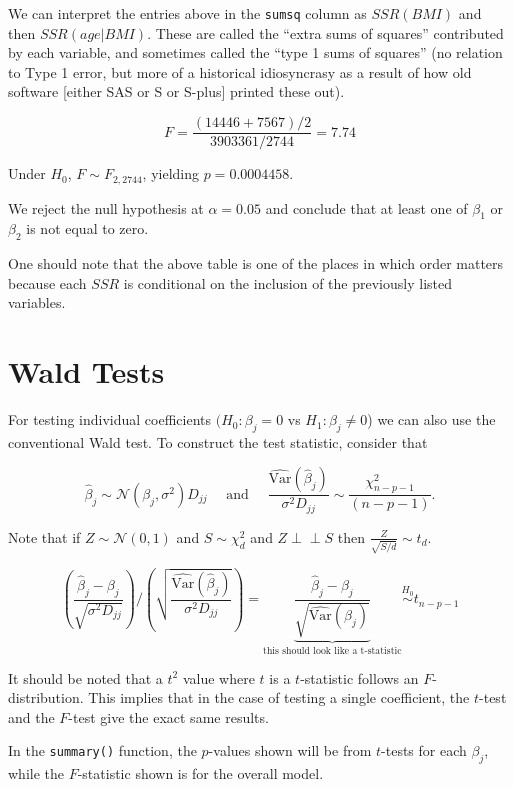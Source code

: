 \documentclass[
  letterpaper,
  DIV=11,
  numbers=noendperiod]{scrreport}
\begin{document}
We can interpret the entries above in the \texttt{sumsq} column as
\(SSR(BMI)\) and then \(SSR(age|BMI)\). These are called the ``extra
sums of squares'' contributed by each variable, and sometimes called the
``type 1 sums of squares'' (no relation to Type 1 error, but more of a
historical idiosyncrasy as a result of how old software {[}either SAS or
S or S-plus{]} printed these out).

\[F = \frac{(14446 + 7567)/2}{3903361/2744} = 7.74\]

Under \(H_0\), \(F \sim F_{2, 2744}\), yielding \(p = 0.0004458\).

We reject the null hypothesis at \(\alpha = 0.05\) and conclude that at
least one of \(\beta_1\) or \(\beta_2\) is not equal to zero.

One should note that the above table is one of the places in which order
matters because each \(SSR\) is conditional on the inclusion of the
previously listed variables.

\hypertarget{wald-tests}{%
\section{Wald Tests}\label{wald-tests}}

For testing individual coefficients \((H_0: \beta_j = 0\) vs
\(H_1: \beta_j \neq 0\)) we can also use the conventional Wald test. To
construct the test statistic, consider that

\[\hat \beta_j \sim \mathcal N(\beta_j, \sigma^2) D_{jj} \quad \text{ and } \quad 
\frac{\hat{\text{Var}} (\hat \beta_j)}{\sigma^2 D_{jj}} \sim \frac{\chi^2_{n-p-1}}{(n-p-1)}.\]

Note that if \(Z \sim \mathcal N(0,1)\) and \(S \sim \chi^2_d\) and
\(Z \perp\!\!\!\perp S\) then \(\frac{Z}{\sqrt{S/d}} \sim t_d\).

\[\left( \frac{\hat \beta_j - \beta_j}{\sqrt{\sigma^2 D_{jj}}} \right) \biggr / 
\left( \sqrt{\frac{\widehat{\text{Var}}(\hat \beta_j)}{\sigma^2D_{jj}}} \right) = \underbrace{\boxed{\frac{\hat \beta_j - \beta_j}{\sqrt{\widehat{\text{Var}}(\hat \beta_j)}}}}_{\text{this should look like a t-statistic}} \stackrel{H_0}{\sim} t_{n-p-1}\]

It should be noted that a \(t^2\) value where \(t\) is a \(t\)-statistic
follows an \(F\)-distribution. This implies that in the case of testing
a single coefficient, the \(t\)-test and the \(F\)-test give the exact
same results.

In the \texttt{summary()} function, the \(p\)-values shown will be from
\(t\)-tests for each \(\beta_j\), while the \(F\)-statistic shown is for
the overall model.
\end{document}
